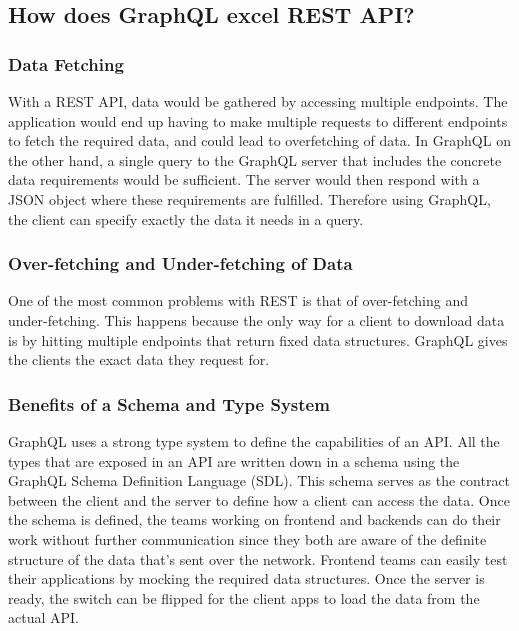 \subsection{How does GraphQL excel REST API?}

\subsubsection{Data Fetching}

With a REST API, data would be gathered by accessing multiple endpoints. The application would  
end up having to make multiple requests to different endpoints to fetch the required data, and could lead to overfetching of data.
In GraphQL on the other hand, a single query to the GraphQL server that 
includes the concrete data requirements would be sufficient. The server would then respond with a JSON object where these 
requirements are fulfilled. Therefore using GraphQL, the client can specify exactly the data it needs in a query.

\subsubsection{Over-fetching and Under-fetching of Data}

One of the most common problems with REST is that of over-fetching and under-fetching. This happens 
because the only way for a client to download data is by hitting multiple endpoints that return fixed data structures.
GraphQL gives the clients the exact data they request for.

\subsubsection{Benefits of a Schema and Type System}

GraphQL uses a strong type system to define the capabilities of an API. All the types that are exposed in an API 
are written down in a schema using the GraphQL Schema Definition Language (SDL). This schema serves as the contract 
between the client and the server to define how a client can access the data.
Once the schema is defined, the teams working on frontend and backends can do their work without further communication 
since they both are aware of the definite structure of the data that’s sent over the network.
Frontend teams can easily test their applications by mocking the required data structures. Once the server is ready, 
the switch can be flipped for the client apps to load the data from the actual API.

